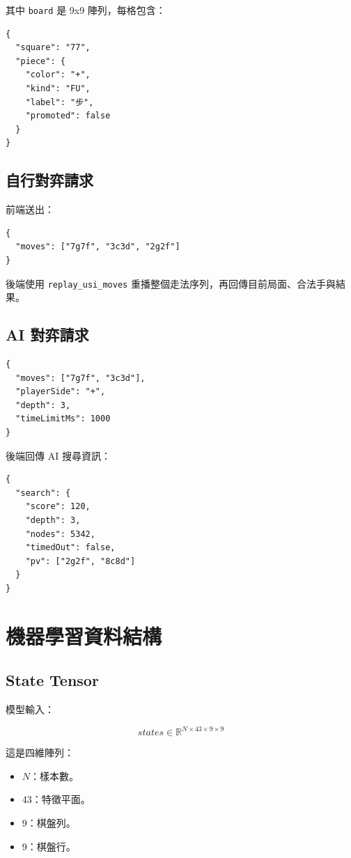 \documentclass[12pt,a4paper,fontset=none]{ctexart}
\begin{document}
其中 \texttt{board} 是 9x9 陣列，每格包含：

\begin{lstlisting}[style=cmd]
{
  "square": "77",
  "piece": {
    "color": "+",
    "kind": "FU",
    "label": "步",
    "promoted": false
  }
}
\end{lstlisting}

\subsection{自行對弈請求}

前端送出：

\begin{lstlisting}[style=cmd]
{
  "moves": ["7g7f", "3c3d", "2g2f"]
}
\end{lstlisting}

後端使用 \texttt{replay\_usi\_moves} 重播整個走法序列，再回傳目前局面、合法手與結果。

\subsection{AI 對弈請求}

\begin{lstlisting}[style=cmd]
{
  "moves": ["7g7f", "3c3d"],
  "playerSide": "+",
  "depth": 3,
  "timeLimitMs": 1000
}
\end{lstlisting}

後端回傳 AI 搜尋資訊：

\begin{lstlisting}[style=cmd]
{
  "search": {
    "score": 120,
    "depth": 3,
    "nodes": 5342,
    "timedOut": false,
    "pv": ["2g2f", "8c8d"]
  }
}
\end{lstlisting}

\section{機器學習資料結構}

\subsection{State Tensor}

模型輸入：

\[
states \in \mathbb{R}^{N \times 43 \times 9 \times 9}
\]

這是四維陣列：

\begin{itemize}
  \item $N$：樣本數。
  \item 43：特徵平面。
  \item 9：棋盤列。
  \item 9：棋盤行。
\end{itemize}
\end{document}
